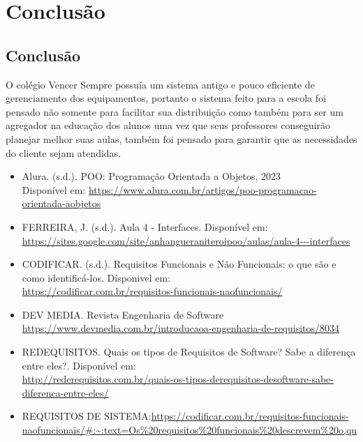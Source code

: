 \documentclass[
	12pt,				%
	openright,			%
	twoside,			%
	a4paper,			%
	english,			%
	french,				%
	spanish,			%
	brazil				%
	]{abntex2}
\begin{document}

\part{Conclusão}

\chapter{Conclusão}

O colégio Vencer Sempre possuía um sistema antigo e pouco eficiente de
gerenciamento dos equipamentos, portanto o sistema feito para a escola foi
pensado não somente para facilitar sua distribuição como também para ser um
agregador na educação dos alunos uma vez que seus professores conseguirão
planejar melhor suas aulas, também foi pensado para garantir que as necessidades
do cliente sejam atendidas.



\postextual



\begin{itemize}
    \item Alura. (s.d.). POO: Programação Orientada a Objetos, 2023 \\
	Disponível em: \url{https://www.alura.com.br/artigos/poo-programacao-orientada-aobjetos}
    \item FERREIRA, J. (s.d.). Aula 4 - Interfaces. Disponível em:\\
	\url{https://sites.google.com/site/anhangueraniteroipoo/aulas/aula-4---interfaces}
    \item CODIFICAR. (s.d.). Requisitos Funcionais e Não Funcionais: o que são e como
	identificá-los. Dísponivel em:\\ \url{https://codificar.com.br/requisitos-funcionais-naofuncionais/}
	\item DEV MEDIA. Revista Engenharia de Software
	\url{https://www.devmedia.com.br/introducaoa-engenharia-de-requisitos/8034}
	\item REDEQUISITOS. Quais os tipos de Requisitos de Software? Sabe a diferença
	entre eles?. Disponível em:\\
	\url{http://rederequisitos.com.br/quais-os-tipos-derequisitos-desoftware-sabe-diferenca-entre-eles/}
	\item REQUISITOS DE SISTEMA:\url{https://codificar.com.br/requisitos-funcionais-naofuncionais/#:~:text=Os%20requisitos%20funcionais%20descrevem%20o,qu}
	
\end{itemize}

\printindex
\end{document}
